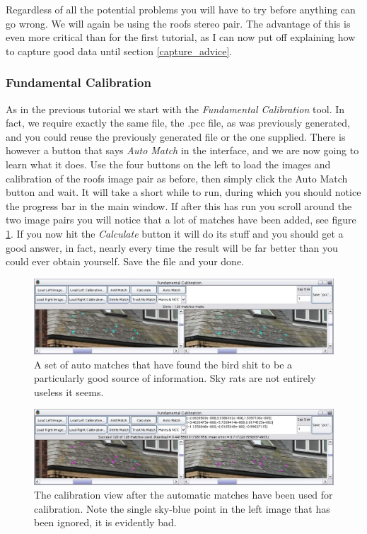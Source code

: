 \documentclass[10pt,a4paper,twoside]{article}
\begin{document}
Regardless of all the potential problems you will have to try before anything can go wrong. We will again be using the roofs stereo pair. The advantage of this is even more critical than for the first tutorial, as I can now put off explaining how to capture good data until section \ref{capture_advice}.


\subsubsection {Fundamental Calibration}
As in the previous tutorial we start with the \emph{Fundamental Calibration} tool. In fact, we require exactly the same file, the .pcc file, as was previously generated, and you could reuse the previously generated file or the one supplied. There is however a button that says \emph{Auto Match} in the interface, and we are now going to learn what it does. Use the four buttons on the left to load the images and calibration of the roofs image pair as before, then simply click the Auto Match button and wait. It will take a short while to run, during which you should notice the progress bar in the main window. If after this has run you scroll around the two image pairs you will notice that a lot of matches have been added, see figure \ref{fig:fundamental_auto}. If you now hit the \emph{Calculate} button it will do its stuff and you should get a good answer, in fact, nearly every time the result will be far better than you could ever obtain yourself. Save the file and your done.

\begin{figure}
 \centering
 \includegraphics[width=1.0\textwidth]{screenshots/fundamental_auto}
 \caption{A set of auto matches that have found the bird shit to be a particularly good source of information. Sky rats are not entirely useless it seems.}
 \label{fig:fundamental_auto}
\end{figure}

\begin{figure}
 \centering
 \includegraphics[width=1.0\textwidth]{screenshots/fundamental_result}
 \caption{The calibration view after the automatic matches have been used for calibration. Note the single sky-blue point in the left image that has been ignored, it is evidently bad.}
 \label{fig:fundamental_result}
\end{figure}
\end{document}
